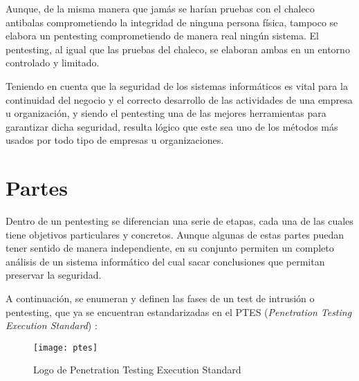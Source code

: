 Aunque, de la misma manera que jamás se harían pruebas con el chaleco antibalas comprometiendo la integridad de ninguna persona física, tampoco se elabora un pentesting comprometiendo de manera real ningún sistema. El pentesting, al igual que las pruebas del chaleco, se elaboran ambas en un entorno controlado y limitado.

Teniendo en cuenta que la seguridad de los sistemas informáticos es vital para la continuidad del negocio y el correcto desarrollo de las actividades de una empresa u organización, y siendo el pentesting una de las mejores herramientas para garantizar dicha seguridad, resulta lógico que este sea uno de los métodos más usados por todo tipo de empresas u organizaciones.



\section{Partes}

Dentro de un pentesting se diferencian una serie de etapas, cada una de las cuales tiene objetivos particulares y concretos. Aunque algunas de estas partes puedan tener sentido de manera independiente, en su conjunto permiten un completo análisis de un sistema informático del cual sacar conclusiones que permitan preservar la seguridad.

A continuación, se enumeran y definen las fases de un test de intrusión o pentesting, que ya se encuentran estandarizadas en el PTES (\textit{Penetration Testing Execution Standard}) \cite{ptes}:

\begin{figure}[H]
	\centering
	\texttt{[image: ptes]}
	\caption{Logo de Penetration Testing Execution Standard}
	\label{fig:ptes}
\end{figure}

